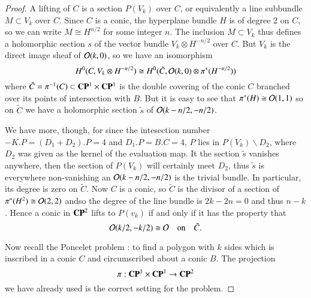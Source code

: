 \begin{proof}
A lifting of $C$ is a section $P(V_{k})$ over $C$, or equivalently a line subbundle $M\subset V_{k}$ over $C$. Since $C$ is a conic, the hyperplane bundle $H$ is of degree 2 on $C$, so we can write $M\cong H^{n/2}$ for some integer $n$. The inclusion $M\subset V_{k}$ thus defines a holomorphic section $s$ of the vector bundle $V_{k}\otimes H^{-n/2}$ over $C$. But $V_{k}$ is the direct image sheaf of $\mathcal{O}(k, 0)$, so we have an isomorphism
$$
H^{0}(C, V_{k}\otimes H^{-n/2}) \cong H^{0}(\tilde{C}, \mathcal{O}(k,0) \otimes \pi^{*}(H^{-n/2}))
$$
where $\tilde{C}= \pi^{-1}(C)\subset \mathbf{C}\mathbf{P}^{1} \times \mathbf{C}\mathbf{P}^{1}$ is the double covering of the conic $C$ branched over its points of intersection with $B$. But it is easy to see that $\pi^{*}(H)\cong\mathcal{O}(1,1)$ so on $\tilde{C}$ we have a holomorphic section $\tilde{s}$ of $\mathcal{O}(k-n/2, -n/2)$.

We have more, though, for since the intesection number$-K.P= (D_{1} + D_{2}). P =4$ and $D_{1}.P = B.C =4$, $P$ lies in $P(V_{k})\backslash D_{2}$, where $D_{2}$ was given as the kernel of the evaluation map. It the section $\tilde{s}$ vanishes anywhere, then the section of $P(V_{k})$ will certainly meet $D_{2}$, thus $\tilde{s}$ is everywhere non-vanishing an $\mathcal{O}(k-n/2, -n/2)$ is the trivial bundle. In particular, its degree is zero on $\tilde{C}$. Now $C$ is a conic, so $\tilde{C}$ is the divisor of a section of $\pi^{*}(H^{2}) \cong \mathcal{O} (2,2)$ and\pageoriginale so the degree of the line bundle is $2k-2n=0$ and thus $n-k$. Hence a conic in $\mathbf{C}\mathbf{P}^{2}$ lifts to $P(v_{k})$ if and only if it has the property that
$$
\mathcal{O}(k/2, -k/2)\cong \mathcal{O} \quad \text{on}\quad \tilde{C}.
$$

Now recall the Poncelet problem \cite{art7-key3}: to find a polygon with $k$ sides which is inscribed in a conic $C$ and circumscribed about a conic $B$. The projection
$$
\pi: \mathbf{C}\mathbf{P}^{1}\times \mathbf{C}\mathbf{P}^{1} \rightarrow \mathbf{C}\mathbf{P}^{2}
$$
we have already used is the correct setting for the problem.


\end{proof}
